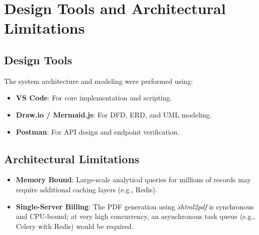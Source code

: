 \documentclass[12pt, a4paper, onecolumn]{report}
\begin{document}
        


\section{Design Tools and Architectural Limitations}

\subsection{Design Tools}
The system architecture and modeling were performed using:
\begin{itemize}
    \item \textbf{VS Code}: For core implementation and scripting.
    \item \textbf{Draw.io / Mermaid.js}: For DFD, ERD, and UML modeling.
    \item \textbf{Postman}: For API design and endpoint verification.
\end{itemize}

\subsection{Architectural Limitations}
\begin{itemize}
    \item \textbf{Memory Bound}: Large-scale analytical queries for millions of records may require additional caching layers (e.g., Redis).
    \item \textbf{Single-Server Billing}: The PDF generation using \textit{xhtml2pdf} is synchronous and CPU-bound; at very high concurrency, an asynchronous task queue (e.g., Celery with Redis) would be required.
\end{itemize}
\end{document}
